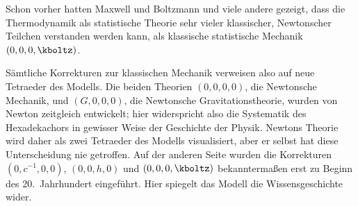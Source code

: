 Schon vorher hatten Maxwell und Boltzmann und viele andere gezeigt, dass die Thermodynamik als statistische Theorie sehr vieler klassischer, Newtonscher Teilchen verstanden werden kann, als klassische statistische Mechanik $(0,0,0,\kboltz)$.

Sämtliche Korrekturen zur klassischen Mechanik verweisen also auf neue Tetraeder des Modells. Die beiden Theorien $(0,0,0,0)$, die Newtonsche Mechanik, und $(G,0,0,0)$, die Newtonsche Gravitationstheorie, wurden von Newton zeitgleich entwickelt; hier widerspricht also die Systematik des Hexadekachors in gewisser Weise der Geschichte der Physik. Newtons Theorie wird daher als zwei Tetraeder des Modells visualisiert, aber er selbst hat diese Unterscheidung nie getroffen. Auf der anderen Seite wurden die Korrekturen $(0,c^{-1},0,0)$, $(0,0,h,0)$ und $(0,0,0,\kboltz)$ bekanntermaßen erst zu Beginn des 20.\ Jahrhundert eingeführt. Hier spiegelt das Modell die Wissensgeschichte wider.
